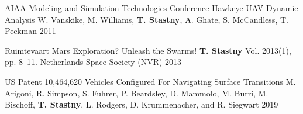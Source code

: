 \begin{cventries}
\begin{cvnumlist}
\item \cvpubentry
	{AIAA Modeling and Simulation Technologies Conference} %
	{Hawkeye UAV Dynamic Analysis} %
	{W. Vanskike, M. Williams, \textbf{T. Stastny}, A. Ghate, S. McCandless, T. Peckman} %
	{} %
	{2011} %
	{} %
	{} %
%
\end{cvnumlist}


\begin{flushleft}
\end{flushleft}

\begin{cvnumlist}
%
\item \cvpubentry
	{Ruimtevaart} %
	{Mars Exploration? Unleash the Swarms!} %
	{\textbf{T. Stastny}} %
	{Vol. 2013(1), pp. 8--11. Netherlands Space Society (NVR)} %
	{2013} %
	{} %
	{} %
%
\end{cvnumlist}

\clearpage
\begin{flushleft}
\end{flushleft}

\begin{cvnumlist}
%
\item \cvpubentry
	{US Patent 10,464,620} %
	{Vehicles Configured For Navigating Surface Transitions} %
	{M. Arigoni, R. Simpson, S. Fuhrer, P. Beardsley, D. Mammolo, M. Burri, M. Bischoff, \textbf{T. Stastny}, L. Rodgers, D. Krummenacher, and R. Siegwart} %
	{} %
	{2019} %
	{} %
	{} %
%
\end{cvnumlist}


\begin{flushleft}
%

%
\end{flushleft}


\end{cventries}
